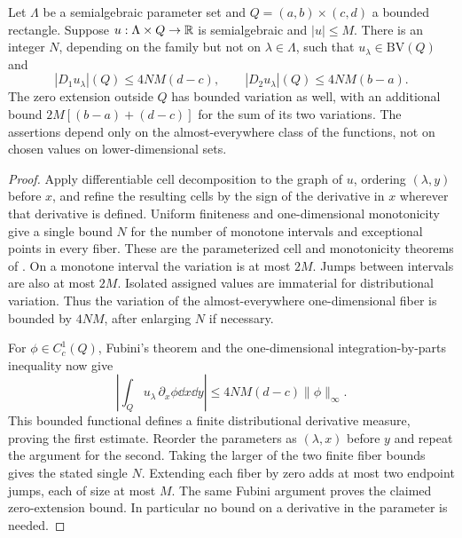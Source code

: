 \begin{proposition}
\label{prop:semialgebraic-slicing}
Let $\Lambda$ be a semialgebraic parameter set and
$Q=(a,b)\times(c,d)$ a bounded rectangle. Suppose
$u:\Lambda\times Q\to\mathbb R$ is semialgebraic and $|u|\le M$.
There is an integer $N$, depending on the family but not on
$\lambda\in\Lambda$, such that $u_\lambda\in\mathrm{BV}(Q)$ and
\begin{equation}\label{eq:slicing-variation-bound}
 |D_1u_\lambda|(Q)\le 4NM(d-c),\qquad
 |D_2u_\lambda|(Q)\le 4NM(b-a).
\end{equation}
The zero extension outside $Q$ has bounded variation as well, with an
additional bound $2M[(b-a)+(d-c)]$ for the sum of its two variations.
The assertions depend only on the almost-everywhere class of the
functions, not on chosen values on lower-dimensional sets.
\end{proposition}
\begin{proof}
Apply differentiable cell decomposition to the graph of $u$, ordering
$(\lambda,y)$ before $x$, and refine the resulting cells by the sign
of the derivative in $x$ wherever that derivative is defined. Uniform
finiteness and one-dimensional monotonicity give a single bound $N$
for the number of monotone intervals and exceptional points in every
fiber. These are the parameterized cell and monotonicity theorems of
\cite[Sections 2.1--2.2 and 6.2]{Coste}. On a monotone interval the
variation is at most $2M$. Jumps between intervals are also at most
$2M$. Isolated assigned values are immaterial for distributional
variation. Thus the variation of the almost-everywhere one-dimensional
fiber is bounded by $4NM$, after enlarging $N$ if necessary.

For $\phi\in C_c^1(Q)$, Fubini's theorem and the one-dimensional
integration-by-parts inequality now give
\[
 \left|\int_Q u_\lambda\,\partial_x\phi\dd x\dd y\right|
 \le 4NM(d-c)\|\phi\|_\infty.
\]
This bounded functional defines a finite distributional derivative
measure, proving the first estimate. Reorder the parameters as
$(\lambda,x)$ before $y$ and repeat the argument for the second.
Taking the larger of the two finite fiber bounds gives the stated
single $N$. Extending each fiber by zero adds at most two endpoint
jumps, each of size at most $M$. The same Fubini argument proves the
claimed zero-extension bound. In particular no bound on a derivative
in the parameter is needed.
\end{proof}

